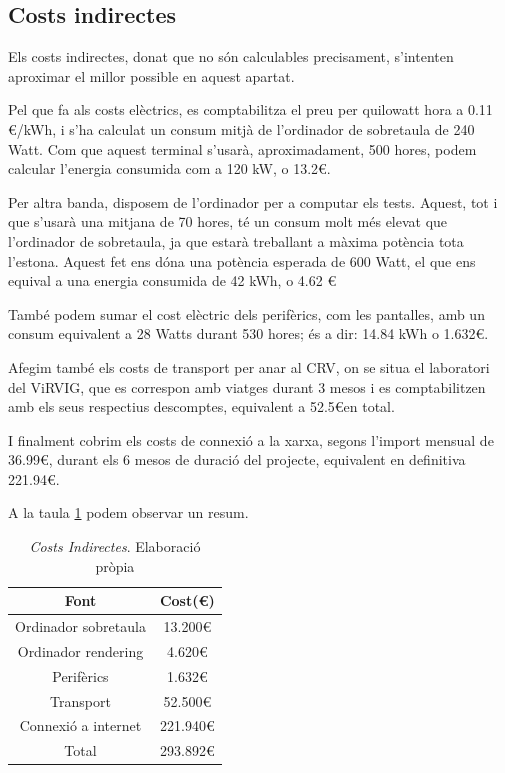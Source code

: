 \documentclass[a4paper]{article} %
\begin{document}
	\subsection{Costs indirectes} \label{section:cIndirectes}
	Els costs indirectes, donat que no són calculables precisament, s'intenten aproximar el millor possible en aquest apartat. \par
	Pel que fa als costs elèctrics, es comptabilitza el preu per quilowatt hora a 0.11 \euro/kWh, i s'ha calculat un consum mitjà de l'ordinador de sobretaula de 240 Watt. Com que aquest terminal s'usarà, aproximadament, 500 hores, podem calcular l'energia consumida com a 120 kW, o 13.2\euro. \par
	Per altra banda, disposem de l'ordinador per a computar els tests. Aquest, tot i que s'usarà una mitjana de 70 hores, té un consum molt més elevat que l'ordinador de sobretaula, ja que estarà treballant a màxima potència tota l'estona. Aquest fet ens dóna una potència esperada de 600 Watt, el que ens equival a una energia consumida de 42 kWh, o 4.62 \euro \par
	També podem sumar el cost elèctric dels perifèrics, com les pantalles, amb un consum equivalent a 28 Watts durant 530 hores; és a dir: 14.84 kWh o 1.632\euro. \par
	Afegim també els costs de transport per anar al CRV, on se situa el laboratori del ViRVIG, que es correspon amb viatges durant 3 mesos i es comptabilitzen amb els seus respectius descomptes, equivalent a 52.5\euro en total. \par
	I finalment cobrim els costs de connexió a la xarxa, segons l'import mensual de 36.99\euro, durant els 6 mesos de duració del projecte, equivalent en definitiva 221.94\euro.\par
	A la taula \ref{table:imprevistosI} podem observar un resum.
	\begin{table}[h!]
		\centering
		\begin{tabular}{||c|| c||}
			\hline
			\textbf{Font} & \textbf{Cost(\euro)} \\
			\hline \hline
			Ordinador sobretaula & 13.200\euro \\
			Ordinador rendering & 4.620\euro \\
			Perifèrics & 1.632\euro \\
			Transport & 52.500\euro \\
			Connexió a internet & 221.940\euro\\
			\hline \hline
			Total & 293.892\euro\\
			\hline
		\end{tabular}
		\caption[\textit{Costs Indirectes}]{\textit{\small Costs Indirectes}. Elaboració pròpia}
		\label{table:imprevistosI}
	\end{table}
	
\end{document}
